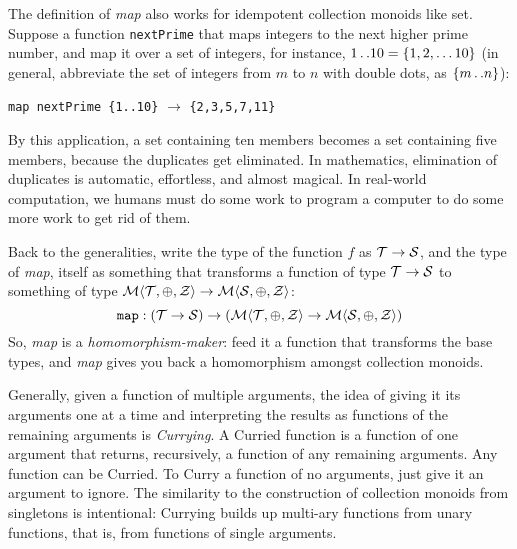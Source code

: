 The definition of \emph{map} also works for idempotent collection monoids like set. Suppose a function \verb"nextPrime" that maps integers to the next higher prime number, and map it over a set of integers, for instance, $1{\text{\,.\,.}}10=\{1,2,\ldots10\}$ (in general, abbreviate the set of integers from $m$ to $n$ with double dots, as $\{ m{\text{\,.\,.}}n\}$): 
\begin{center}
  \verb"map nextPrime {1..10}" $\rightarrow$ \verb"{2,3,5,7,11}" 
\end{center}
By this application, a set containing ten members becomes a set containing five members, because the duplicates get eliminated. In mathematics, elimination of duplicates is automatic, effortless, and almost magical. In real-world computation, we humans must do some work to program a computer to do some more work to get rid of them. 


Back to the generalities, write the type of the function $f$ as $\mathcal{T}\rightarrow\mathcal{S}$, and the type of \emph{map}, itself as something that transforms a function of type $\mathcal{T}\rightarrow\mathcal{S}$ to something of type $\mathcal{M}\langle{\mathcal{T}},{\oplus},{\mathcal{Z}}\rangle\rightarrow\mathcal{M}\langle{\mathcal{S}},{\oplus},{\mathcal{Z}}\rangle$:
\begin{equation}
  \mathtt{map}:(\mathcal{T}\rightarrow\mathcal{S})\rightarrow
    \left(\mathcal{M}\langle{\mathcal{T}},{\oplus},{\mathcal{Z}}\rangle
    \rightarrow\mathcal{M}\langle{\mathcal{S}},{\oplus},{\mathcal{Z}}\rangle\right)
  \label{eqn:mapdefinition}
\end{equation}
So, \emph{map} is a \emph{homomorphism-maker}: feed it a function that transforms the base types, and \emph{map} gives you back a homomorphism amongst collection monoids.


\begin{remark}
Generally, given a function of multiple arguments, the idea of giving it its arguments one at a time and interpreting the results as functions of the remaining arguments is \emph{Currying}. A Curried function is a function of one argument that returns, recursively, a function of any remaining arguments. Any function can be Curried. To Curry a function of no arguments, just give it an argument to ignore. The similarity to the construction of collection monoids from singletons is intentional: Currying builds up multi-ary functions from unary functions, that is, from functions of single arguments.
\end{remark}


